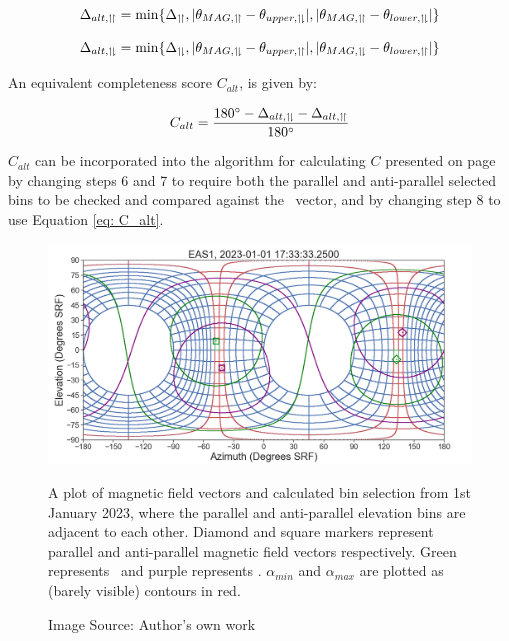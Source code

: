 \begin{equation} \label{eq: loss para _alt}
    \Delta_{alt, \upharpoonleft \! \upharpoonright}=\min\{\Delta_{\upharpoonleft \! \upharpoonright}, |\theta_{MAG, \upharpoonleft \! \upharpoonright}-\theta_{upper, \upharpoonleft \! \downharpoonright}|, |\theta_{MAG, \upharpoonleft \! \upharpoonright}-\theta_{lower, \upharpoonleft \! \downharpoonright}|\}
\end{equation}

\begin{equation} \label{eq: loss anti _alt}
    \Delta_{alt, \upharpoonleft \! \downharpoonright}=\min\{\Delta_{\upharpoonleft \! \downharpoonright}, |\theta_{MAG, \upharpoonleft \! \downharpoonright}-\theta_{upper, \upharpoonleft \! \upharpoonright}|, |\theta_{MAG, \upharpoonleft \! \downharpoonright}-\theta_{lower, \upharpoonleft \! \upharpoonright}|\}
\end{equation}

An equivalent completeness score \(C_{alt}\), is given by:

\begin{equation} \label{eq: C_alt}
    C_{alt}=\frac{180\degree-\Delta_{alt, \upharpoonleft \! \downharpoonright}-\Delta_{alt, \upharpoonleft \! \upharpoonright}}{180\degree}
\end{equation}

\(C_{alt}\) can be incorporated into the algorithm for calculating \(C\) presented on page \pageref{alg: C algorithm} by changing steps 6 and 7 to require both the parallel and anti-parallel selected bins to be checked and compared against the \Bmag\ vector, and by changing step 8 to use Equation \ref{eq: C_alt}.
\\

\begin{figure}[h!]
    \centering
    \centerfloat
    \includegraphics[width=1.1\linewidth]{figures/Crossover Example.png}
    \caption{A plot of magnetic field vectors and calculated bin selection from 1st January 2023, where the parallel and anti-parallel elevation bins are adjacent to each other. Diamond and square markers represent parallel and anti-parallel magnetic field vectors respectively. Green represents \Beas\ and purple represents \Bmag. \(\alpha_{min}\) and \(\alpha_{max}\) are plotted as (barely visible) contours in red.}
    \caption*{Image Source: Author's own work}
    \label{fig: para antipara crossover}
\end{figure}


